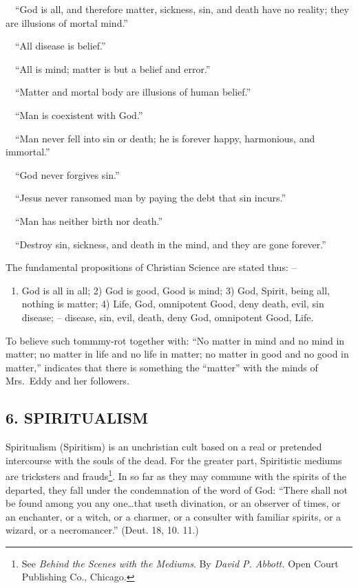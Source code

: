 \documentclass[
]{book}
\providecommand{\tightlist}{%
  \setlength{\itemsep}{0pt}\setlength{\parskip}{0pt}}
\begin{document}
~~``God is all, and therefore matter, sickness, sin, and death have no reality; they are illusions of mortal mind.''

~~``All disease is belief.''

~~``All is mind; matter is but a belief and error.''

~~``Matter and mortal body are illusions of human belief.''

~~``Man is coexistent with God.''

~~``Man never fell into sin or death; he is forever happy, harmonious, and immortal.''

~~``God never forgives sin.''

~~``Jesus never ransomed man by paying the debt that sin incurs.''

~~``Man has neither birth nor death.''

~~``Destroy sin, sickness, and death in the mind, and they are gone forever.''

The fundamental propositions of Christian Science are stated thus: --

\begin{enumerate}
\def\labelenumi{\arabic{enumi})}
\tightlist
\item
  God is all in all; 2) God is good, Good is mind; 3) God, Spirit, being all, nothing is matter; 4) Life, God, omnipotent Good, deny death, evil, sin disease; -- disease, sin, evil, death, deny God, omnipotent Good, Life.
\end{enumerate}

To believe such tommmy-rot together with: ``No matter in mind and no mind in matter; no matter in life and no life in matter; no matter in good and no good in matter,'' indicates that there is something the ``matter'' with the minds of Mrs.~Eddy and her followers.

\hypertarget{spiritualism}{%
\subsection*{\texorpdfstring{6. SPIRITUALISM}{6. SPIRITUALISM}}\label{spiritualism}}

Spiritualism (Spiritism) is an unchristian cult based on a real or pretended intercourse with the souls of the dead. For the greater part, Spiritistic mediums are tricksters and frauds\footnote{See \emph{Behind the Scenes with the Mediums}. By \emph{David P. Abbott.} Open Court Publishing Co., Chicago.}. In so far as they may commune with the spirits of the departed, they fall under the condemnation of the word of God: ``There shall not be found among you any one\ldots that useth divination, or an observer of times, or an enchanter, or a witch, or a charmer, or a consulter with familiar spirits, or a wizard, or a necromancer.'' (Deut. 18, 10. 11.)
\end{document}
